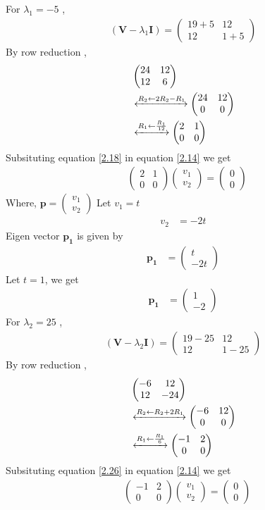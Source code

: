 \documentclass[journal,12pt,twocolumn]{IEEEtran}
\let\vec\mathbf
\numberwithin{equation}{subsection}
\newcommand{\myvec}[1]{\ensuremath{\begin{pmatrix}#1\end{pmatrix}}}
\begin{document}
For $\lambda_1=-5$ ,
\begin{align}
    (\vec{V}-\lambda_1\vec{I})=\myvec{19+5 & 12 \\12 & 1+5}
\end{align}
By row reduction , 
\begin{align}
    &\myvec{24 & 12 \\12 & 6}\\
&\xleftrightarrow{R_2\leftarrow 2R_2 -R_1}
    \myvec{24 & 12 \\ 0& 0}\\
        &\xleftrightarrow{R_1\leftarrow \frac{R_1}{12}}
    \myvec{2 & 1 \\ 0& 0}
    \label{2.18}
\end{align}
Subsituting equation \ref{2.18} in equation \ref{2.14} we get
\begin{align}
        &   \myvec{2 & 1 \\ 0& 0}\myvec{v_1 \\ v_2}=\myvec{0 \\ 0}\label{2.19}
\end{align}
Where, $\vec{p}=\myvec{v_1\\v_2}$
Let $v_1=t$
\begin{align}
    v_2&=-2t
\end{align}
Eigen vector $\vec{p_1}$ is given by
\begin{align}
    \vec{p_1}&=\myvec{t \\ -2t}
\end{align}
Let $t=1$, we get
\begin{align}
        \vec{p_1}&=\myvec{1 \\-2 }\label{2.22}
\end{align}
For $\lambda_2=25$ ,
\begin{align}
    (\vec{V}-\lambda_2\vec{I})=\myvec{19-25 & 12 \\12 & 1-25}
\end{align}
By row reduction , 
\begin{align}
    &\myvec{-6 & 12 \\12 & -24}\\
&\xleftrightarrow{R_2\leftarrow R_2 +2R_1}
    \myvec{-6 & 12 \\ 0& 0}\\
        &\xleftrightarrow{R_1\leftarrow \frac{R_1}{6}}
    \myvec{-1 & 2 \\ 0& 0}
    \label{2.26}
\end{align}
Subsituting equation \ref{2.26} in equation \ref{2.14} we get
\begin{align}
        &   \myvec{-1 & 2 \\ 0& 0}\myvec{v_1 \\ v_2}=\myvec{0 \\ 0}\label{2.27}
\end{align}
\end{document}
